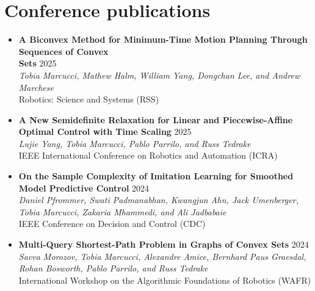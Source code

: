 \documentclass[11pt,a4paper,sans]{moderncv}
\begin{document}
\section{Conference publications}

\vspace{5pt}

\begin{itemize}
	
\item \textbf{A Biconvex Method for Minimum-Time Motion Planning Through Sequences of Convex \\ Sets} \hfill 2025 \\
\textit{Tobia Marcucci, Mathew Halm, William Yang, Dongchan Lee, and Andrew Marchese } \\
Robotics: Science and Systems (RSS)

	
\item \textbf{A New Semidefinite Relaxation for Linear and Piecewise-Affine Optimal Control with Time Scaling} \hfill 2025 \\
\textit{Lujie Yang, Tobia Marcucci, Pablo Parrilo, and Russ Tedrake} \\
IEEE International Conference on Robotics and Automation (ICRA)
	
\item \textbf{On the Sample Complexity of Imitation Learning for Smoothed Model Predictive Control} \hfill 2024 \\
\textit{Daniel Pfrommer, Swati Padmanabhan, Kwangjun Ahn, Jack Umenberger, Tobia Marcucci, Zakaria Mhammedi, and Ali Jadbabaie} \\
IEEE Conference on Decision and Control (CDC)
	
\item \textbf{Multi-Query Shortest-Path Problem in Graphs of Convex Sets} \hfill 2024 \\
\textit{Savva Morozov, Tobia Marcucci, Alexandre Amice, Bernhard Paus Graesdal,  Rohan Bosworth,  Pablo Parrilo, and Russ Tedrake} \\
International Workshop on the Algorithmic Foundations of Robotics (WAFR)


\end{itemize}
\end{document}
